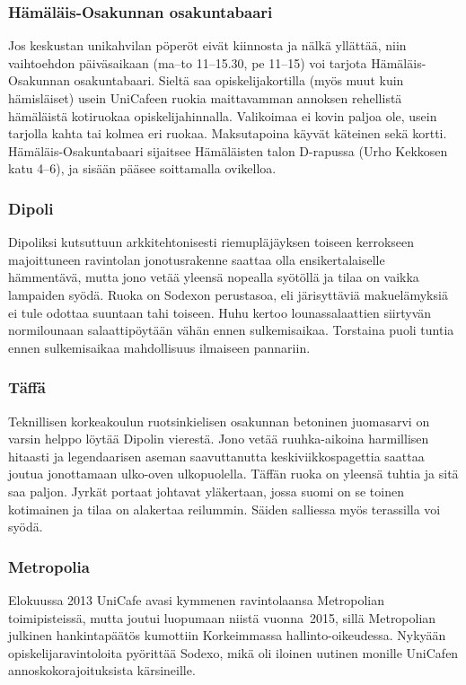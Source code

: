 \documentclass[../ala_hataile.tex]{subfiles}
\begin{document}
\subsubsection*{Hämäläis-Osakunnan
osakuntabaari}
Jos keskustan unikahvilan pöperöt eivät
kiinnosta ja nälkä yllättää, niin vaihtoehdon
päiväsaikaan (ma--to 11--15.30, pe
11--15) voi tarjota Hämäläis-Osakunnan
osakuntabaari. Sieltä saa opiskelijakortilla
(myös muut kuin hämisläiset) usein
UniCafeen ruokia maittavamman annoksen
rehellistä hämäläistä kotiruokaa opiskelijahinnalla.
Valikoimaa ei kovin paljoa
ole, usein tarjolla kahta tai kolmea eri ruokaa.
Maksutapoina käyvät käteinen sekä
kortti. Hämäläis-Osakuntabaari sijaitsee
Hämäläisten talon D-rapussa (Urho Kekkosen
katu 4--6), ja sisään pääsee soittamalla
ovikelloa.
\subsubsection*{Dipoli}
Dipoliksi kutsuttuun arkkitehtonisesti
riemupläjäyksen toiseen kerrokseen majoittuneen
ravintolan jonotusrakenne saattaa
olla ensikertalaiselle hämmentävä, mutta
jono vetää yleensä nopealla syötöllä ja
tilaa on vaikka lampaiden syödä. Ruoka on Sodexon perustasoa, eli järisyttäviä makuelämyksiä
ei tule odottaa suuntaan tahi
toiseen. Huhu kertoo lounassalaattien siirtyvän
normilounaan salaattipöytään vähän
ennen sulkemisaikaa. Torstaina puoli tuntia
ennen sulkemisaikaa mahdollisuus ilmaiseen
pannariin.
\subsubsection*{Täffä}
Teknillisen korkeakoulun ruotsinkielisen
osakunnan betoninen juomasarvi on
varsin helppo löytää Dipolin vierestä. Jono
vetää ruuhka-aikoina harmillisen hitaasti ja
legendaarisen aseman saavuttanutta keskiviikkospagettia
saattaa joutua jonottamaan
ulko-oven ulkopuolella. Täffän ruoka on
yleensä tuhtia ja sitä saa paljon. Jyrkät
portaat johtavat yläkertaan, jossa suomi on
se toinen kotimainen ja tilaa on alakertaa
reilummin. Säiden salliessa myös terassilla
voi syödä.
\subsubsection*{Metropolia}
Elokuussa 2013 UniCafe avasi kymmenen ravintolaansa
Metropolian toimipisteissä, mutta joutui luopumaan niistä vuonna~2015, sillä Metropolian julkinen hankintapäätös kumottiin Korkeimmassa hallinto-oikeudessa. Nykyään opiskelijaravintoloita pyörittää Sodexo, mikä oli iloinen uutinen monille UniCafen annos\-koko\-rajoituksista kärsineille.
\end{document}
